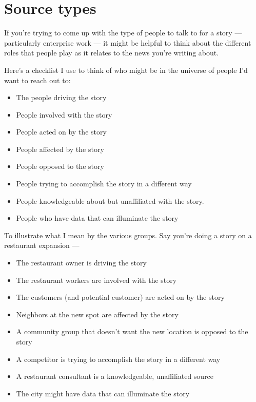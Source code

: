 \documentclass[
  11pt,
  american,
  letterpaperpaper,
  extrafontsizes,onecolumn,openright
  ]{memoir}
\providecommand{\tightlist}{%
  \setlength{\itemsep}{0pt}\setlength{\parskip}{0pt}}
\begin{document}
\hypertarget{source-types}{%
\chapter{Source types}\label{source-types}}

If you're trying to come up with the type of people to talk to for a story --- particularly enterprise work --- it might be helpful to think about the different roles that people play as it relates to the news you're writing about.

Here's a checklist I use to think of who might be in the universe of people I'd want to reach out to:

\begin{itemize}
\tightlist
\item
  The people driving the story
\item
  People involved with the story
\item
  People acted on by the story
\item
  People affected by the story
\item
  People opposed to the story
\item
  People trying to accomplish the story in a different way
\item
  People knowledgeable about but unaffiliated with the story.
\item
  People who have data that can illuminate the story
\end{itemize}

To illustrate what I mean by the various groups. Say you're doing a story on a restaurant expansion ---

\begin{itemize}
\tightlist
\item
  The restaurant owner is driving the story
\item
  The restaurant workers are involved with the story
\item
  The customers (and potential customer) are acted on by the story
\item
  Neighbors at the new spot are affected by the story
\item
  A community group that doesn't want the new location is opposed to the story
\item
  A competitor is trying to accomplish the story in a different way
\item
  A restaurant consultant is a knowledgeable, unaffiliated source
\item
  The city might have data that can illuminate the story
\end{itemize}
\end{document}

